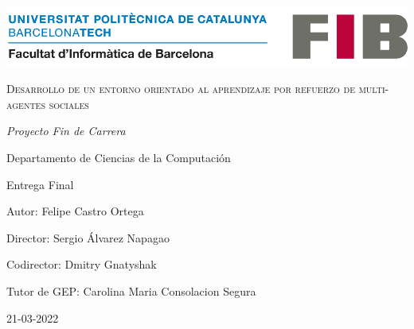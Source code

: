 \begin{titlepage}
\centering
{\includegraphics[width=1\textwidth]{img/logo-fib.png}\par}
\vspace{3cm}
{\scshape\Huge Desarrollo de un entorno orientado al aprendizaje por refuerzo de multi-agentes sociales \par}
\vspace{3cm}
{\itshape\Large Proyecto Fin de Carrera \par Departamento de Ciencias de la Computación \par Entrega Final \par}
\vfill
{\Large Autor: Felipe Castro Ortega \par}
{\Large Director: Sergio Álvarez Napagao \par}
{\Large Codirector: Dmitry Gnatyshak \par}
{\Large Tutor de GEP: Carolina Maria Consolacion Segura \par}
\vfill
{\Large 21-03-2022}
\end{titlepage}